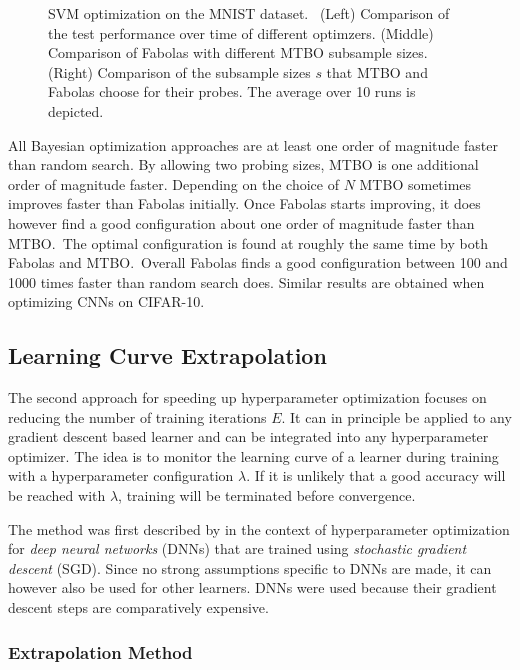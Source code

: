 \begin{figure}
\begin{subfigure}[b]{0.34\textwidth}
	\end{subfigure}
	\caption{
		SVM optimization on the MNIST dataset.\
		(Left) Comparison of the test performance over time of different optimzers.
		(Middle) Comparison of Fabolas with different MTBO subsample sizes.
		(Right) Comparison of the subsample sizes \(s\) that MTBO and Fabolas choose for their probes.
		The average over 10 runs is depicted.
	}\label{fig:fabolas:eval}
\end{figure}
All Bayesian optimization approaches are at least one order of magnitude faster than random search.
By allowing two probing sizes, MTBO is one additional order of magnitude faster.
Depending on the choice of \(N\) MTBO sometimes improves faster than Fabolas initially.
Once Fabolas starts improving, it does however find a good configuration about one order of magnitude faster than MTBO.\
The optimal configuration is found at roughly the same time by both Fabolas and MTBO.\
Overall Fabolas finds a good configuration between 100 and 1000 times faster than random search does.
Similar results are obtained when optimizing CNNs on CIFAR-10.

\subsection{Learning Curve Extrapolation}%
\label{sec:hyperparams:earlyterm}

The second approach for speeding up hyperparameter optimization focuses on reducing the number of training iterations \(E\).
It can in principle be applied to any gradient descent based learner and can be integrated into any hyperparameter optimizer.
The idea is to monitor the learning curve of a learner during training with a hyperparameter configuration \(\lambda\).
If it is unlikely that a good accuracy will be reached with \(\lambda\), training will be terminated before convergence.

The method was first described by \citet{Domhan2015} in the context of hyperparameter optimization for \textit{deep neural networks} (DNNs) that are trained using \textit{stochastic gradient descent} (SGD).
Since no strong assumptions specific to DNNs are made, it can however also be used for other learners.
DNNs were used because their gradient descent steps are comparatively expensive.

\subsubsection{Extrapolation Method}%
\label{sec:hyperparams:earlyterm:method}

